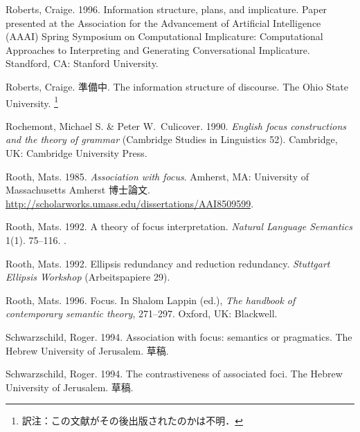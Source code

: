\documentclass{goken}
\begin{document}
\begin{thebibliography}{74}
Roberts, Craige. 1996{}.
\newblock Information structure, plans, and implicature.
\newblock Paper presented at the Association for the Advancement of Artificial
  Intelligence (AAAI) Spring Symposium on Computational Implicature:
  Computational Approaches to Interpreting and Generating Conversational
  Implicature. Standford, CA: Stanford University.

\renewcommand{\thefootnote}{\fnsymbol{footnote}}
\setcounter{footnote}{0}
Roberts, Craige. 準備中.
\newblock The information structure of discourse.
\newblock The Ohio State University.
\footnote{訳注：この文献がその後出版されたのかは不明．}

Rochemont, Michael S. \& Peter W.~Culicover. 1990.
\newblock \emph{English focus constructions and the theory of grammar}
  (Cambridge Studies in Linguistics 52).
\newblock Cambridge, UK: Cambridge University Press.

Rooth, Mats. 1985.
\newblock \emph{Association with focus}.
\newblock Amherst, MA: University of Massachusetts Amherst 博士論文.
\newblock
  \urlprefix\url{http://scholarworks.umass.edu/dissertations/AAI8509599}.

Rooth, Mats. 1992{}.
\newblock A theory of focus interpretation.
\newblock \emph{Natural Language Semantics} 1(1). 75--116.
\newblock {}.

Rooth, Mats. 1992{}.
\newblock Ellipsis redundancy and reduction redundancy.
\newblock \emph{Stuttgart Ellipsis Workshop} (Arbeitspapiere 29).

Rooth, Mats. 1996.
\newblock Focus.
\newblock In Shalom Lappin (ed.), \emph{The handbook of contemporary semantic
  theory}, 271--297. Oxford, UK: Blackwell.

Schwarzschild, Roger. 1994{}.
\newblock Association with focus: semantics or pragmatics.
\newblock The Hebrew University of Jerusalem.
\newblock 草稿.

Schwarzschild, Roger. 1994{}.
\newblock The contrastiveness of associated foci.
\newblock The Hebrew University of Jerusalem.
\newblock 草稿.


\end{thebibliography}
\end{document}
